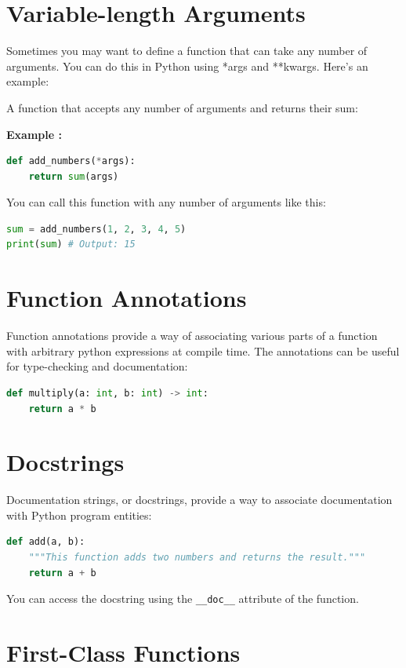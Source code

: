 \documentclass[12pt]{book}
\newtheorem{Example}{Example}[chapter]
\renewenvironment{Example}{\begin{trivlist}\item\relax
\textbf{Example \thesection: }}{\end{trivlist}}
\begin{document}
\section{Variable-length Arguments}
Sometimes you may want to define a function that can take any number of arguments. You can do this in Python using *args and **kwargs. Here's an example:


A function that accepts any number of arguments and returns their sum:
\begin{Example}
\begin{lstlisting}[language=Python]
def add_numbers(*args):
	return sum(args)
\end{lstlisting}
You can call this function with any number of arguments like this:
\begin{lstlisting}[language=Python]
sum = add_numbers(1, 2, 3, 4, 5)
print(sum) # Output: 15
\end{lstlisting}
\end{Example}

\section{Function Annotations}

Function annotations provide a way of associating various parts of a function with arbitrary python expressions at compile time. The annotations can be useful for type-checking and documentation:

\begin{lstlisting}[language=Python]
def multiply(a: int, b: int) -> int:
    return a * b
\end{lstlisting}

\section{Docstrings}

Documentation strings, or docstrings, provide a way to associate documentation with Python program entities:

\begin{lstlisting}[language=Python]
def add(a, b):
    """This function adds two numbers and returns the result."""
    return a + b
\end{lstlisting}

You can access the docstring using the \texttt{\_\_doc\_\_} attribute of the function.

\section{First-Class Functions}
\end{document}

